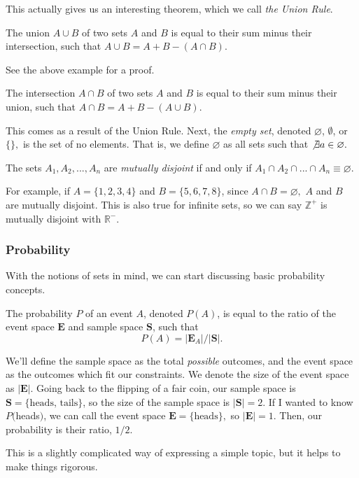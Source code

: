 \documentclass[11pt]{article}
\begin{document}
\noindent This actually gives us an interesting theorem, which we call \textit{the Union Rule}.
\begin{thrm}
	The union $A \cup B$ of two sets $A$ and $B$ is equal to their sum minus their intersection, such that $A \cup B = A + B - (A \cap B)$.
\end{thrm}
See the above example for a proof.
\begin{corr}
	The intersection $A \cap B$ of two sets $A$ and $B$ is equal to their sum minus their union, such that $A \cap B = A + B - (A \cup B)$.
\end{corr}
This comes as a result of the Union Rule. Next, the \textit{empty set}, denoted $\varnothing$, $\emptyset$, or $\{\},$ is the set of no elements. That is, we define $\varnothing$ as all sets such that $\not\exists a \in \varnothing.$

\begin{defn}
	The sets $A_1, A_2,...,A_n$ are \textit{mutually disjoint} if and only if $A_1 \cap A_2\cap...\cap A_n \equiv \varnothing.$
\end{defn}
For example, if $A = \{1, 2, 3, 4\}$ and $B = \{5, 6, 7, 8\}$, since $A \cap B = \varnothing,$ $A$ and $B$ are mutually disjoint. This is also true for infinite sets, so we can say $\mathbb{Z}^{+}$ is mutually disjoint with $\mathbb{R}^{-}$.

\subsubsection*{Probability}
With the notions of sets in mind, we can start discussing basic probability concepts.
\begin{defn}
	The probability $P$ of an event $A$, denoted $P(A)$, is equal to the ratio of the event space $\textbf{E}$ and sample space $\textbf{S}$, such that
	\[P(A) = |\mathbf{E}_A|/|\mathbf{S}|.\]
\end{defn}

We'll define the sample space as the total \textit{possible} outcomes, and the event space as the outcomes which fit our constraints. We denote the size of the event space as $|\mathbf{E}|$. Going back to the flipping of a fair coin, our sample space is $\mathbf{S} = \{\text{heads, tails}\}$, so the size of the sample space is $|\mathbf{S}| = 2$. If I wanted to know $P($heads$)$, we can call the event space $\mathbf{E} = \{\text{heads}\},$ so $|\mathbf{E}| = 1$. Then, our probability is their ratio, $1/2$.

This is a slightly complicated way of expressing a simple topic, but it helps to make things rigorous.
\end{document}
